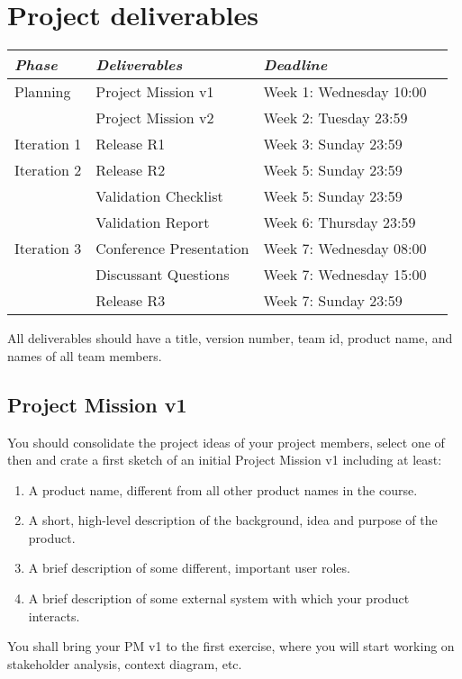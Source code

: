 \documentclass{project}
\begin{document}
\section{Project deliverables}
\begin{tabular}{l |l p{5cm}  l}
{\it Phase} & {\it Deliverables} & {\it Deadline} \\
\hline
Planning & Project Mission v1& Week 1: Wednesday 10:00\\
         & Project Mission v2& Week 2: Tuesday 23:59\\
Iteration 1 & Release R1 & Week 3: Sunday 23:59 \\
Iteration 2 & Release R2  & Week 5: Sunday 23:59\\
            & Validation Checklist & Week 5: Sunday 23:59\\
            & Validation Report & Week 6: Thursday 23:59\\
            Iteration 3 & Conference Presentation & Week 7: Wednesday 08:00\\
            & Discussant Questions & Week 7: Wednesday 15:00\\
            & Release R3 & Week 7: Sunday 23:59\\
      
\end{tabular}
\vskip3mm

\noindent All deliverables should have a title, version number, team id, product name, and names of all team members. 

\subsection{Project Mission v1}

You should consolidate the project ideas of your project members, select one of then and crate a first sketch of an initial Project Mission v1 including at least:
\begin{enumerate}[noitemsep]
  \item A product name, different from all other product names in the course. 
  \item A short, high-level description of the background, idea and purpose of the product. 
  \item A brief description of some different, important user roles.
  \item A brief description of some external system with which your product interacts.
\end{enumerate}
You shall bring your PM v1 to the first exercise, where you will start working on stakeholder analysis, context diagram, etc.
\end{document}
